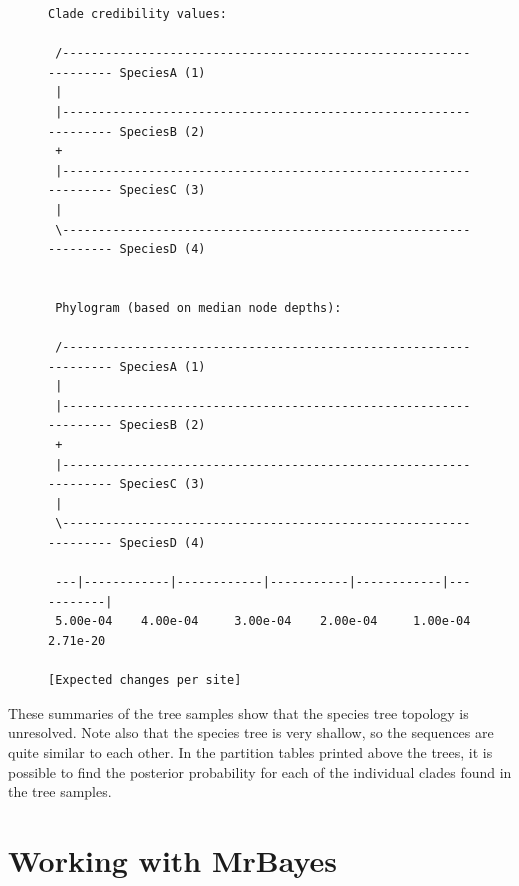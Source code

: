 \documentclass[12pt]{book}
\begin{document}
\begin{figure}[h]
\centering
\begin{BVerbatim}[fontsize=\scriptsize]
Clade credibility values:

 /------------------------------------------------------------------ SpeciesA (1)
 |                                                                               
 |------------------------------------------------------------------ SpeciesB (2)
 +                                                                               
 |------------------------------------------------------------------ SpeciesC (3)
 |                                                                               
 \------------------------------------------------------------------ SpeciesD (4)
                                                                                 

 Phylogram (based on median node depths):

 /------------------------------------------------------------------ SpeciesA (1)
 |                                                                               
 |------------------------------------------------------------------ SpeciesB (2)
 +                                                                               
 |------------------------------------------------------------------ SpeciesC (3)
 |                                                                               
 \------------------------------------------------------------------ SpeciesD (4)
                                                                                 
 ---|------------|------------|-----------|------------|-----------|             
 5.00e-04    4.00e-04     3.00e-04    2.00e-04     1.00e-04    2.71e-20 

[Expected changes per site]
\end{BVerbatim}
\end{figure}

These summaries of the tree samples show that the species tree topology is unresolved. Note also
that the species tree is very shallow, so the sequences are quite similar to each other. In the
partition tables printed above the trees, it is possible to find the posterior probability for each
of the individual clades found in the tree samples.

\chapter{Working with MrBayes}\label{advancedTopics}
\end{document}
